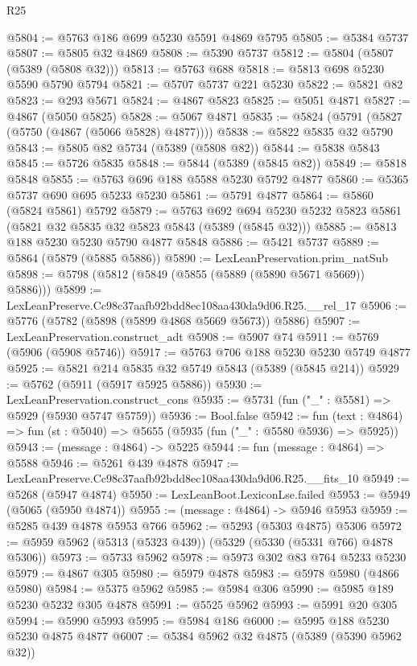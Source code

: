 \begin{lexlean}{R25}
\begin{coremodule}
@5804 := @5763 @186 @699 @5230 @5591 @4869 @5795
@5805 := @5384 @5737
@5807 := @5805 @32 @4869
@5808 := @5390 @5737
@5812 := @5804 (@5807 (@5389 (@5808 @32)))
@5813 := @5763 @688
@5818 := @5813 @698 @5230 @5590 @5790 @5794
@5821 := @5707 @5737 @221 @5230
@5822 := @5821 @82
@5823 := @293 @5671
@5824 := @4867 @5823
@5825 := @5051 @4871
@5827 := @4867 (@5050 @5825)
@5828 := @5067 @4871
@5835 := @5824 (@5791 (@5827 (@5750 (@4867 (@5066 @5828) @4877))))
@5838 := @5822 @5835 @32 @5790
@5843 := @5805 @82 @5734 (@5389 (@5808 @82))
@5844 := @5838 @5843
@5845 := @5726 @5835
@5848 := @5844 (@5389 (@5845 @82))
@5849 := @5818 @5848
@5855 := @5763 @696 @188 @5588 @5230 @5792 @4877
@5860 := @5365 @5737 @690 @695 @5233 @5230
@5861 := @5791 @4877
@5864 := @5860 (@5824 @5861) @5792
@5879 := @5763
    @692
    @694
    @5230
    @5232
    @5823
    @5861
    (@5821 @32 @5835 @32 @5823 @5843 (@5389 (@5845 @32)))
@5885 := @5813 @188 @5230 @5230 @5790 @4877 @5848
@5886 := @5421 @5737
@5889 := @5864 (@5879 (@5885 @5886))
@5890 := LexLeanPreservation.prim_natSub
@5898 := @5798 (@5812 (@5849 (@5855 (@5889 (@5890 @5671 @5669)) @5886)))
@5899 := LexLeanPreserve.Cc98c37aafb92bdd8ec108aa430da9d06.R25.__rel_17
@5906 := @5776 (@5782 (@5898 (@5899 @4868 @5669 @5673)) @5886)
@5907 := LexLeanPreservation.construct_adt
@5908 := @5907 @74
@5911 := @5769 (@5906 (@5908 @5746))
@5917 := @5763 @706 @188 @5230 @5230 @5749 @4877
@5925 := @5821 @214 @5835 @32 @5749 @5843 (@5389 (@5845 @214))
@5929 := @5762 (@5911 (@5917 @5925 @5886))
@5930 := LexLeanPreservation.construct_cons
@5935 := @5731 (fun ("_" : @5581) => @5929 (@5930 @5747 @5759))
@5936 := Bool.false
@5942 := fun (text : @4864) => fun (st : @5040) => @5655 (@5935 (fun ("_" : @5580 @5936) => @5925))
@5943 := (message : @4864) -> @5225
@5944 := fun (message : @4864) => @5588
@5946 := @5261 @439 @4878
@5947 := LexLeanPreserve.Cc98c37aafb92bdd8ec108aa430da9d06.R25.__fits_10
@5949 := @5268 (@5947 @4874)
@5950 := LexLeanBoot.LexiconLse.failed
@5953 := @5949 (@5065 (@5950 @4874))
@5955 := (message : @4864) -> @5946 @5953
@5959 := @5285 @439 @4878 @5953 @766
@5962 := @5293 (@5303 @4875) @5306
@5972 := @5959 @5962 (@5313 (@5323 @439)) (@5329 (@5330 (@5331 @766) @4878 @5306))
@5973 := @5733 @5962
@5978 := @5973 @302 @83 @764 @5233 @5230
@5979 := @4867 @305
@5980 := @5979 @4878
@5983 := @5978 @5980 (@4866 @5980)
@5984 := @5375 @5962
@5985 := @5984 @306
@5990 := @5985 @189 @5230 @5232 @305 @4878
@5991 := @5525 @5962
@5993 := @5991 @20 @305
@5994 := @5990 @5993
@5995 := @5984 @186
@6000 := @5995 @188 @5230 @5230 @4875 @4877
@6007 := @5384 @5962 @32 @4875 (@5389 (@5390 @5962 @32))

\end{coremodule}
\end{lexlean}
